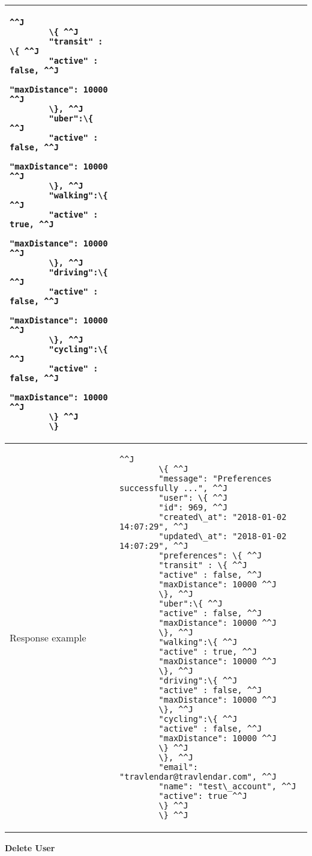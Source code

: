 \begin{tabularx}{\linewidth}{| l | l |}
{		\bigskip
		\begin{lstlisting}^^J
		\{ ^^J
		"transit" : \{ ^^J
		"active" : false, ^^J
		"maxDistance": 10000 ^^J
		\}, ^^J
		"uber":\{ ^^J
		"active" : false, ^^J
		"maxDistance": 10000 ^^J
		\}, ^^J
		"walking":\{ ^^J
		"active" : true, ^^J
		"maxDistance": 10000 ^^J
		\}, ^^J
		"driving":\{ ^^J
		"active" : false, ^^J
		"maxDistance": 10000 ^^J
		\}, ^^J
		"cycling":\{ ^^J
		"active" : false, ^^J
		"maxDistance": 10000 ^^J
		\} ^^J
		\}
		\end{lstlisting}
	} \\ 
	\hline
	Response example & 
	\parbox{0.8\textwidth}{
		\bigskip
		\begin{lstlisting}^^J
		\{ ^^J
		"message": "Preferences successfully ...", ^^J
		"user": \{ ^^J
		"id": 969, ^^J
		"created\_at": "2018-01-02 14:07:29", ^^J
		"updated\_at": "2018-01-02 14:07:29", ^^J
		"preferences": \{ ^^J
		"transit" : \{ ^^J
		"active" : false, ^^J
		"maxDistance": 10000 ^^J
		\}, ^^J
		"uber":\{ ^^J
		"active" : false, ^^J
		"maxDistance": 10000 ^^J
		\}, ^^J
		"walking":\{ ^^J
		"active" : true, ^^J
		"maxDistance": 10000 ^^J
		\}, ^^J
		"driving":\{ ^^J
		"active" : false, ^^J
		"maxDistance": 10000 ^^J
		\}, ^^J
		"cycling":\{ ^^J
		"active" : false, ^^J
		"maxDistance": 10000 ^^J
		\} ^^J
		\}, ^^J
		"email": "travlendar@travlendar.com", ^^J
		"name": "test\_account", ^^J
		"active": true ^^J
		\} ^^J
		\} ^^J
		\end{lstlisting}
	}  \\
	\hline
\end{tabularx}
\newpage
\textbf{Delete User}

